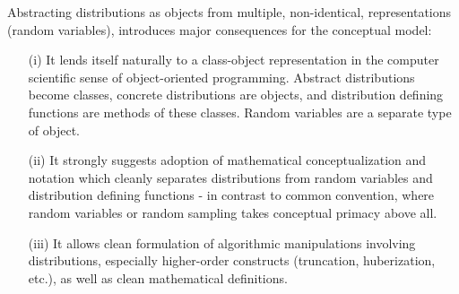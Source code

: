 Abstracting distributions as objects from multiple, non-identical, representations (random variables), introduces major consequences for the conceptual model:

\begin{enumerate}
\itemsep-0.2em
\item[(i)] It lends itself naturally to a class-object representation in the computer scientific sense of object-oriented programming. Abstract distributions become classes, concrete distributions are objects, and distribution defining functions are methods of these classes. Random variables are a separate type of object.
\item[(ii)] It strongly suggests adoption of mathematical conceptualization and notation which cleanly separates distributions from random variables and distribution defining functions - in contrast to common convention, where random variables or random sampling takes conceptual primacy above all.
\item[(iii)] It allows clean formulation of algorithmic manipulations involving distributions, especially higher-order constructs (truncation, huberization, etc.), as well as clean mathematical definitions.
\end{enumerate}

